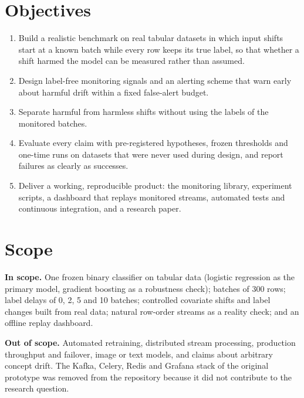 \section{Objectives}
\begin{enumerate}
\item Build a realistic benchmark on real tabular datasets in which input shifts start at a known batch while every row keeps its true label, so that whether a shift harmed the model can be measured rather than assumed.
\item Design label-free monitoring signals and an alerting scheme that warn early about harmful drift within a fixed false-alert budget.
\item Separate harmful from harmless shifts without using the labels of the monitored batches.
\item Evaluate every claim with pre-registered hypotheses, frozen thresholds and one-time runs on datasets that were never used during design, and report failures as clearly as successes.
\item Deliver a working, reproducible product: the monitoring library, experiment scripts, a dashboard that replays monitored streams, automated tests and continuous integration, and a research paper.
\end{enumerate}

\section{Scope}
\textbf{In scope.} One frozen binary classifier on tabular data (logistic regression as the primary model, gradient boosting as a robustness check); batches of 300 rows; label delays of 0, 2, 5 and 10 batches; controlled covariate shifts and label changes built from real data; natural row-order streams as a reality check; and an offline replay dashboard.

\textbf{Out of scope.} Automated retraining, distributed stream processing, production throughput and failover, image or text models, and claims about arbitrary concept drift. The Kafka, Celery, Redis and Grafana stack of the original prototype was removed from the repository because it did not contribute to the research question.

